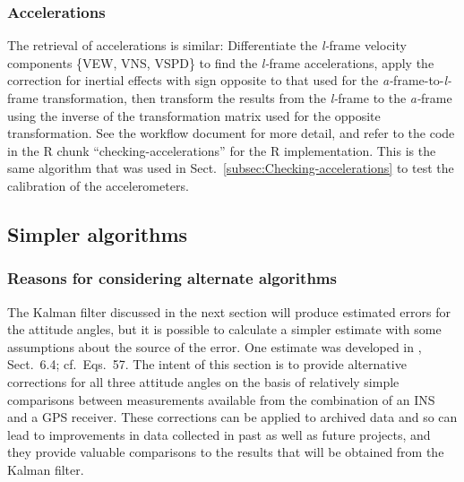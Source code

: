 \documentclass[12pt,twoside,english,12pt,twoside,english]{article}\usepackage[]{graphicx}\usepackage[]{color}
\let\OrgIndex\index
\renewcommand*{\index}[1]{\OrgIndex{#1}}
\begin{document}
\subsubsection{Accelerations\label{subsec:retrieving-accelerations}}

The retrieval of accelerations
is similar: Differentiate the \emph{l-}frame
velocity components \{VEW,
VNS, VSPD\}
to find the \emph{l-}frame
accelerations, apply the correction for inertial
effects with sign opposite to that used for the \emph{a-}frame-to-\emph{l-}frame
transformation, then transform
the results from the \emph{l-}frame to the \emph{a-}frame using the
inverse of the transformation matrix
used for the opposite transformation. See the workflow document
for more detail, and refer to the code in the R chunk ``checking-accelerations''
for the R implementation. This is the same algorithm that was used
in Sect.~\ref{subsec:Checking-accelerations} to test the calibration
of the accelerometers. 

\subsection{Simpler algorithms}

\subsubsection{Reasons for considering alternate algorithms}

The
Kalman filter discussed in the next section will produce estimated
errors for the
attitude angles, but it is possible
to calculate a simpler estimate with some assumptions about the source
of the error. One estimate was developed in \citet{Cooper2016ncartn},
Sect.~6.4; cf.~Eqs.~57. The intent of this section is to provide
alternative corrections for all three attitude angles on the basis
of relatively simple comparisons between
measurements available from the combination of an INS
and a GPS receiver. These corrections
can be applied to archived data and
so can lead to improvements in data collected in past
as well as future projects, and they provide valuable comparisons
to the results that will be obtained from the Kalman filter. 
\end{document}
